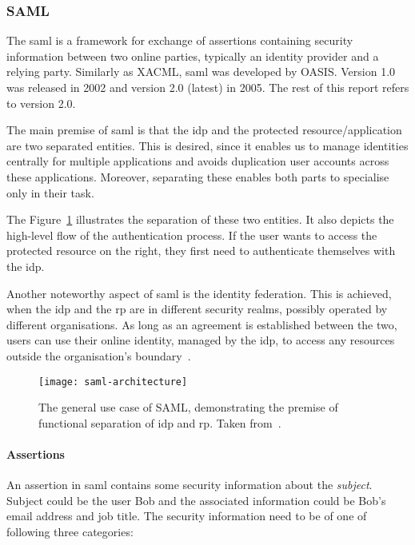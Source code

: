 \subsubsection{SAML}\label{sec:saml}

The \acrfull{saml} is a framework for exchange of assertions containing security information between two online parties, typically an identity provider and a relying party. Similarly as XACML, \acrshort{saml} was developed by OASIS. Version 1.0 was released in 2002 and version 2.0 (latest) in 2005. The rest of this report refers to version 2.0.

The main premise of \acrshort{saml} is that the \acrfull{idp} and the protected resource/application are two separated entities. This is desired, since it enables us to manage identities centrally for multiple applications and avoids duplication user accounts across these applications. Moreover, separating these enables both parts to specialise only in their task.

The Figure~\ref{fig:saml-architectire} illustrates the separation of these two entities. It also depicts the high-level flow of the authentication process. If the user wants to access the protected resource on the right, they first need to authenticate themselves with the \acrshort{idp}.

Another noteworthy aspect of \acrshort{saml} is the identity federation. This is achieved, when the \acrshort{idp} and the \acrshort{rp} are in different security realms, possibly operated by different organisations. As long as an agreement is established between the two, users can use their online identity, managed by the \acrshort{idp}, to access any resources outside the organisation's boundary~\cite{2008SecurityOverview}.

 \begin{figure}[ht]
    \centering
    \texttt{[image: saml-architecture]}
    \caption{The general use case of SAML, demonstrating the premise of functional separation of \acrshort{idp} and \acrshort{rp}. Taken from~\cite{2008SecurityOverview}.}
    \label{fig:saml-architectire}
\end{figure}

\paragraph{Assertions}
An assertion in \acrshort{saml} contains some security information about the \textit{subject}. Subject could be the user Bob and the associated information could be Bob's email address and job title. The security information need to be of one of following three categories:

